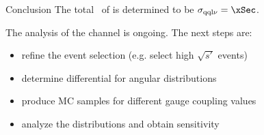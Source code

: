 \documentclass{beamer}
\newcommand{\figurepath}{../analysis/fig/fig_full}
\newcommand{\tripleFigDistance}{\vspace{-1.2em}}
\begin{document}
\begin{frame}{Conclusion}
The total \xsec\ of \eeto\qqln is determined to be $\sigma_\mathrm{\qqln} = \xSec$.

\vspace{1em}

The analysis of the \eeto\qqln channel is ongoing. The next steps are:
\begin{itemize}
\item refine the event selection (e.g. select high $\sqrt{s'}$ events)
\item determine differential  for angular distributions
\item produce MC samples for different gauge coupling values
\item analyze the distributions and obtain sensitivity
\end{itemize}



\vspace{1em}
\end{frame}




\end{document}
